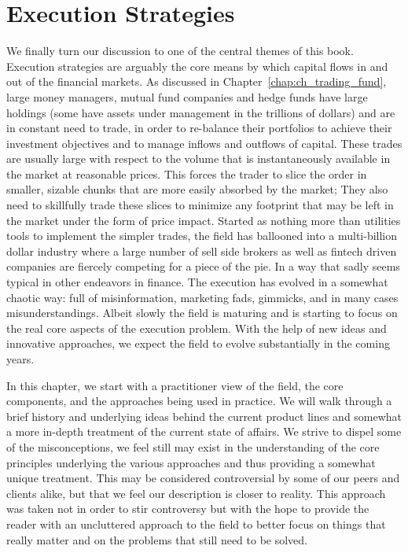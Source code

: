 \chapter{Execution Strategies\label{chap:ch_exec_models}}

We finally turn our discussion to one of the central themes of this book. Execution strategies are arguably the core means by which capital flows in and out of the financial markets.  As discussed in Chapter~\ref{chap:ch_trading_fund}, large money managers, mutual fund companies and hedge funds have large holdings (some have assets under management in the trillions of dollars) and are in constant need to trade, in order to re-balance their portfolios to achieve their investment objectives and to manage inflows and outflows of capital. These trades are usually large with respect to the volume that is instantaneously available in the market at reasonable prices. This forces the trader to slice the order in smaller, sizable chunks that are more easily absorbed by the market; They also need to skillfully trade these slices to minimize any footprint that may be left in the market under the form of price impact. Started as nothing more than utilities tools to implement the simpler trades, the field has ballooned into a multi-billion dollar industry where a large number of sell side brokers as well as fintech driven companies are fiercely competing for a piece of the pie. In a way that sadly seems typical in other endeavors in finance. The execution has evolved in a somewhat chaotic way: full of misinformation, marketing fads, gimmicks, and in many cases misunderstandings. Albeit slowly the field is maturing and is starting to focus on the real core aspects of the execution problem. With the help of new ideas and innovative approaches, we expect the field to evolve substantially in the coming years.


In this chapter, we start with a practitioner view of the field, the core components, and the approaches being used in practice. We will walk through a brief history and underlying ideas behind the current product lines and somewhat a more in-depth treatment of the current state of affairs. We strive to dispel some of the misconceptions, we feel still may exist in the understanding of the core principles underlying the various approaches and thus providing a somewhat unique treatment. This may be considered controversial by some of our peers and clients alike, but that we feel our description is closer to reality. This approach was taken not in order to stir controversy but  with the hope to provide the reader with an uncluttered approach to the field to better focus on things that really matter and on the problems that still need to be solved.


